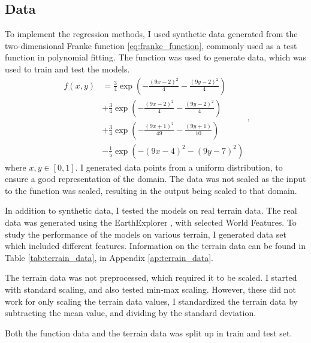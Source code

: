 \subsection{Data}\label{ssec:data}
To implement the regression methods, I used synthetic data generated from the two-dimensional Franke function \eqref{eq:franke_function}, commonly used as a test function in polynomial fitting. The function was used to generate data, which was used to train and test the models. 
\begin{equation}\label{eq:franke_function}
\begin{split}
    f(x, y) &= \frac{3}{4} \exp(- \frac{(9x-2)^{2}}{4} - \frac{(9y-2)^{2}}{4} ) \\
    &+ \frac{3}{4} \exp(- \frac{(9x-2)^{2}}{4} - \frac{(9y-2)^{2}}{4} ) \\
    &+ \frac{3}{4} \exp(- \frac{(9x+1)^{2}}{49} - \frac{(9y+1)}{10} ) \\ 
    &- \frac{1}{5} \exp(- (9x-4)^{2} - (9y-7)^{2} ) 
\end{split}, 
\end{equation}
where $x, y \in [0, 1]$. I generated data points from a uniform distribution, to ensure a good representation of the domain. The data was not scaled as the input to the function was scaled, resulting in the output being scaled to that domain.

In addition to synthetic data, I tested the models on real terrain data. The real data was generated using the EarthExplorer \cite{usgov:2024:earthexplorer}, with selected World Features. To study the performance of the models on various terrain, I generated data set which included different features. Information on the terrain data can be found in Table \ref{tab:terrain_data}, in Appendix \ref{ap:terrain_data}.

The terrain data was not preprocessed, which required it to be scaled. I started with standard scaling, and also tested min-max scaling. However, these did not work for only scaling the terrain data values, I standardized the terrain data by subtracting the mean value, and dividing by the standard deviation.

Both the function data and the terrain data was split up in train and test set.


